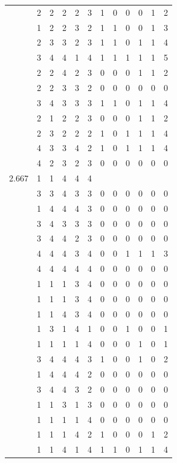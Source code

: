 \documentclass[]{book}
\theoremstyle{definition}
\theoremstyle{definition}
\theoremstyle{definition}
\theoremstyle{remark}
\begin{document}
\begin{table}
{\begin{tabular}[t]{rrrrrrrrrrrr}
 & 2 & 2 & 2 & 2 & 3 & 1 & 0 & 0 & 0 & 1 & 2\\
 & 1 & 2 & 2 & 3 & 2 & 1 & 1 & 0 & 0 & 1 & 3\\
 & 2 & 3 & 3 & 2 & 3 & 1 & 1 & 0 & 1 & 1 & 4\\
 & 3 & 4 & 4 & 1 & 4 & 1 & 1 & 1 & 1 & 1 & 5\\
 & 2 & 2 & 4 & 2 & 3 & 0 & 0 & 0 & 1 & 1 & 2\\
 & 2 & 2 & 3 & 3 & 2 & 0 & 0 & 0 & 0 & 0 & 0\\
 & 3 & 4 & 3 & 3 & 3 & 1 & 1 & 0 & 1 & 1 & 4\\
 & 2 & 1 & 2 & 2 & 3 & 0 & 0 & 0 & 1 & 1 & 2\\
 & 2 & 3 & 2 & 2 & 2 & 1 & 0 & 1 & 1 & 1 & 4\\
 & 4 & 3 & 3 & 4 & 2 & 1 & 0 & 1 & 1 & 1 & 4\\
 & 4 & 2 & 3 & 2 & 3 & 0 & 0 & 0 & 0 & 0 & 0\\
2.667 & 1 & 1 & 4 & 4 & 4 &  &  &  &  &  & \\
 & 3 & 3 & 4 & 3 & 3 & 0 & 0 & 0 & 0 & 0 & 0\\
 & 1 & 4 & 4 & 4 & 3 & 0 & 0 & 0 & 0 & 0 & 0\\
 & 3 & 4 & 3 & 3 & 3 & 0 & 0 & 0 & 0 & 0 & 0\\
 & 3 & 4 & 4 & 2 & 3 & 0 & 0 & 0 & 0 & 0 & 0\\
 & 4 & 4 & 4 & 3 & 4 & 0 & 0 & 1 & 1 & 1 & 3\\
 & 4 & 4 & 4 & 4 & 4 & 0 & 0 & 0 & 0 & 0 & 0\\
 & 1 & 1 & 1 & 3 & 4 & 0 & 0 & 0 & 0 & 0 & 0\\
 & 1 & 1 & 1 & 3 & 4 & 0 & 0 & 0 & 0 & 0 & 0\\
 & 1 & 1 & 4 & 3 & 4 & 0 & 0 & 0 & 0 & 0 & 0\\
 & 1 & 3 & 1 & 4 & 1 & 0 & 0 & 1 & 0 & 0 & 1\\
 & 1 & 1 & 1 & 1 & 4 & 0 & 0 & 0 & 1 & 0 & 1\\
 & 3 & 4 & 4 & 4 & 3 & 1 & 0 & 0 & 1 & 0 & 2\\
 & 1 & 4 & 4 & 4 & 2 & 0 & 0 & 0 & 0 & 0 & 0\\
 & 3 & 4 & 4 & 3 & 2 & 0 & 0 & 0 & 0 & 0 & 0\\
 & 1 & 1 & 3 & 1 & 3 & 0 & 0 & 0 & 0 & 0 & 0\\
 & 1 & 1 & 1 & 1 & 4 & 0 & 0 & 0 & 0 & 0 & 0\\
 & 1 & 1 & 1 & 4 & 2 & 1 & 0 & 0 & 0 & 1 & 2\\
 & 1 & 1 & 4 & 1 & 4 & 1 & 1 & 0 & 1 & 1 & 4\\

\end{tabular}}
\end{table}
\end{document}
